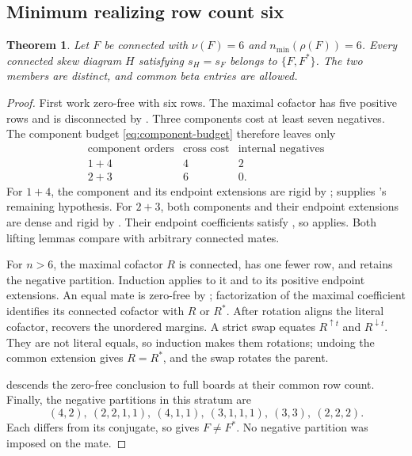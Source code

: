 \documentclass[11pt,a4paper]{amsart}
\numberwithin{equation}{section}
\theoremstyle{plain}
\newtheorem{theorem}{Theorem}[section]
\theoremstyle{definition}
\begin{document}
\subsection{Minimum realizing row count six}

\begin{theorem}\label{thm:six-negative-minimum}
Let \(F\) be connected with \(\nu(F)=6\) and
\(n_{\min}(\rho(F))=6\).  Every connected skew diagram \(H\) satisfying
\(s_H=s_F\) belongs to \(\{F,F^*\}\).  The two members are distinct,
and common beta entries are allowed.
\end{theorem}

\begin{proof}
First work zero-free with six rows.  The maximal cofactor has five positive
rows and is disconnected by .
Three components cost at least seven negatives.  The component budget
\eqref{eq:component-budget} therefore leaves only
\[
\begin{array}{c|c|c}
\text{component orders}&\text{cross cost}&\text{internal negatives}\\\hline
1+4&4&2\\
2+3&6&0.
\end{array}
\]
For \(1+4\), the component and its endpoint extensions are rigid by
;  supplies
's remaining hypothesis.  For \(2+3\), both
components and their endpoint extensions are dense and rigid by
.  Their endpoint coefficients satisfy
, so  applies.
Both lifting lemmas compare with arbitrary connected mates.

For \(n>6\), the maximal cofactor \(R\) is connected, has one fewer row,
and retains the negative partition.  Induction applies to it and to its
positive endpoint extensions.  An equal mate is zero-free by
; factorization of the maximal coefficient identifies
its connected cofactor with \(R\) or \(R^*\).  After rotation aligns the
literal cofactor,  recovers the unordered margins.
A strict swap equates \(R^{\uparrow t}\) and \(R^{\downarrow t}\).
They are not literal equals, so induction makes them rotations; undoing
the common extension gives \(R=R^*\), and the swap rotates the parent.

 descends the zero-free conclusion to full boards
at their common row count.  Finally, the negative partitions in this
stratum are
\[
 (4,2),\ (2,2,1,1),\ (4,1,1),\ (3,1,1,1),\ (3,3),\ (2,2,2).
\]
Each differs from its conjugate, so  gives
\(F\ne F^*\).  No negative partition was imposed on the mate.
\end{proof}
\end{document}
